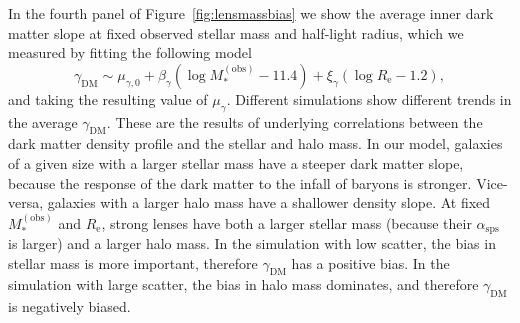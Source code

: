 \documentclass{aa}
\def\reff{R_{\mathrm{e}}}
\def\asps{\alpha_{\mathrm{sps}}}
\def\mobs{M_*^{(\mathrm{obs})}}
\def\gammadm{\gamma_{\mathrm{DM}}}
\def\mdmfive{M_{\mathrm{DM}, 5}}
\def\mhalo{M_{\mathrm{h}}}
\def\Fref#1{Figure~\ref{#1}\xspace}
\begin{document}
In the fourth panel of \Fref{fig:lensmassbias} we show the average inner dark matter slope at fixed observed stellar mass and half-light radius, which we measured by fitting the following model
\begin{equation}\label{eq:dmscaling}
\gammadm \sim \mu_{\gamma,0} + \beta_{\gamma}(\log{\mobs} - 11.4) + \xi_{\gamma}(\log{\reff} - 1.2),
\end{equation}
and taking the resulting value of $\mu_{\gamma}$.
Different simulations show different trends in the average $\gammadm$.
These are the results of underlying correlations between the dark matter density profile and the stellar and halo mass.
In our model, galaxies of a given size with a larger stellar mass have a steeper dark matter slope, because the response of the dark matter to the infall of baryons is stronger. Vice-versa, galaxies with a larger halo mass have a shallower density slope.
At fixed $\mobs$ and $\reff$, strong lenses have both a larger stellar mass (because their $\asps$ is larger) and a larger halo mass.
In the simulation with low scatter, the bias in stellar mass is more important, therefore $\gammadm$ has a positive bias. In the simulation with large scatter, the bias in halo mass dominates, and therefore $\gammadm$ is negatively biased.

\end{document}
